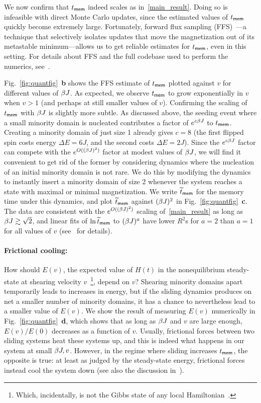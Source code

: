 \documentclass[prl,aps,twocolumn,groupedaddress,superscriptaddress,preprintnumbers,nobibnotes]{revtex4-2}
\newcommand{\tmem}{{t_{\sf mem}}}
\begin{document}
	We now confirm that $\tmem$ indeed scales as in~\eqref{main_result}. Doing so is infeasible with direct Monte Carlo updates, since the estimated values of $\tmem$ quickly become extremely large. Fortunately, forward flux sampling (FFS)~\cite{allen2009forward}---a technique that selectively isolates updates that move the magnetization out of its metastable minimum---allows us to get reliable estimates for $\tmem$, even in this setting. For details about FFS and the full codebase used to perform the numerics, see~\cite{code}. 
	
	Fig.~\ref{fig:quantfig}~{\bf b} shows the FFS estimate of $\tmem$ plotted against $v$ for different values of $\beta J$. As expected, we observe $\tmem$ to grow exponentially in $v$ when $v>1$ (and perhaps at still smaller values of $v$). 
	Confirming the scaling of $\tmem$ with $\beta J$ is slightly more subtle. As discussed above, the seeding event where a small minority domain is nucleated contributes a factor of $e^{c\beta J}$ to $\tmem$. Creating a minority domain of just size 1 already gives $c = 8$ (the first flipped spin costs energy $\Delta E = 6J$, and the second costs $\Delta E = 2J$). Since the $e^{c \beta J}$ factor can compete with the $e^{O((\beta J)^2)}$ factor at modest values of $\beta J$, we will find it convenient to get rid of the former by considering dynamics where the nucleation of an initial minority domain is not rare. We do this by modifying the dynamics to instantly insert a minority domain of size 2 whenever the system reaches a state with maximal or minimal magnetization. We write $\widetilde t_{\sf mem}$ for the memory time under this dynamics, and plot $\widetilde t_{\sf mem}$ against $(\beta J)^2$ in Fig.~\ref{fig:quantfig}~{\bf c}. The data are consistent with the $e^{O((\beta J)^2)}$ scaling of~\eqref{main_result} as long as $\beta J \gtrsim \sqrt 2$, and linear fits of $\ln \widetilde t_{\sf mem}$ to $(\beta J)^a$ have lower $R^2$s for $a = 2$ than $a=1$ for all values of $v$ (see~\cite{code} for details).
	
	
	\paragraph*{Frictional cooling: } How should $E(v)$, the expected value of $H(t)$ in the nonequilibrium steady-state at shearing velocity $v$~\footnote{Which, incidentally, is not the Gibbs state of any local Hamiltonian~\cite{hilhorst2011two}.}, depend on $v$? Shearing minority domains apart temporarily leads to increases in energy, but if the sliding dynamics produces on net a smaller number of minority domains, it has a chance to nevertheless lead to a smaller value of $E(v)$. We show the result of measuring $E(v)$ numerically in Fig.~\ref{fig:quantfig}~{\bf d}, which shows that as long as $\beta J$ and $v$ are large enough, $E(v)/E(0)$ decreases as a function of $v$. 
	Usually, frictional forces between two sliding systems heat these systems up, and this is indeed what happens in our system at small $\beta J,v$. However, in the regime where sliding increases $\tmem$, the opposite is true: at least as judged by the steady-state energy, frictional forces instead cool the system down (see also the discussion in~\cite{kadau2008magnetic}). 
	
\end{document}
